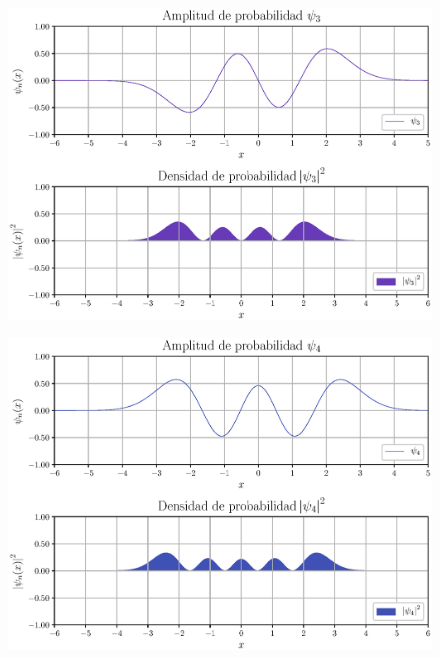 \documentclass[12pt]{beamer}
\begin{document}
\begin{frame}[plain]
\begin{figure}[H]
\centering
\includegraphics[scale=0.5]{Imagenes/Funcion_Onda_03.eps}
\end{figure}
\end{frame}
\begin{frame}[plain]
\begin{figure}[H]
\centering
\includegraphics[scale=0.5]{Imagenes/Funcion_Onda_04.eps}
\end{figure}
\end{frame}
\end{document}
